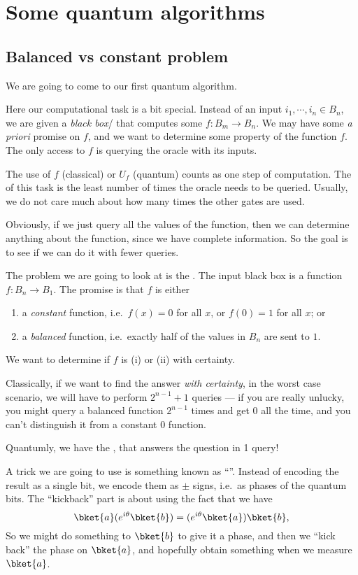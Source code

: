 \documentclass[a4paper]{article}
\begin{document}
\section{Some quantum algorithms}
\subsection{Balanced vs constant problem}
We are going to come to our first quantum algorithm.

Here our computational task is a bit special. Instead of an input $i_1, \cdots, i_n \in B_n$, we are given a \emph{black box}/ that computes some $f: B_m \to B_n$. We may have some \emph{a priori} promise on $f$, and we want to determine some property of the function $f$. The only access to $f$ is querying the oracle with its inputs.

The use of $f$ (classical) or $U_f$ (quantum) counts as one step of computation. The  of this task is the least number of times the oracle needs to be queried. Usually, we do not care much about how many times the other gates are used.

Obviously, if we just query all the values of the function, then we can determine anything about the function, since we have complete information. So the goal is to see if we can do it with fewer queries.

The problem we are going to look at is the . The input black box is a function $f: B_n \to B_1$. The promise is that $f$ is either
\begin{enumerate}
  \item a \emph{constant} function, i.e.\ $f(x) = 0$ for all $x$, or $f(0) = 1$ for all $x$; or
  \item a \emph{balanced} function, i.e.\ exactly half of the values in $B_n$ are sent to $1$.
\end{enumerate}
We want to determine if $f$ is (i) or (ii) with certainty.

Classically, if we want to find the answer \emph{with certainty}, in the worst case scenario, we will have to perform $2^{n - 1} + 1$ queries --- if you are really unlucky, you might query a balanced function $2^{n - 1}$ times and get $0$ all the time, and you can't distinguish it from a constant $0$ function.

Quantumly, we have the , that answers the question in 1 query!

A trick we are going to use is something known as ``''. Instead of encoding the result as a single bit, we encode them as $\pm$ signs, i.e.\ as phases of the quantum bits. The ``kickback'' part is about using the fact that we have
\[
  \bket{a} (e^{i\theta}\bket{b}) = (e^{i\theta}\bket{a})\bket{b},
\]
So we might do something to $\bket{b}$ to give it a phase, and then we ``kick back'' the phase on $\bket{a}$, and hopefully obtain something when we measure $\bket{a}$.
\end{document}
